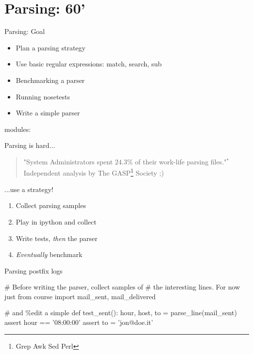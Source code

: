 \section{Parsing: 60'}

\begin{pyframe}{Parsing: Goal}
\begin{itemize}
\item Plan a parsing strategy
\item Use basic regular expressions: match, search, sub
\item Benchmarking a parser
\item Running nosetests
\item Write a simple parser
\end{itemize}
modules: 
\end{pyframe}


\begin{pyframe}{Parsing is hard...}
\begin{verse}
"System Administrators spent $24.3\%$ of
 their work-life parsing files."$^{*}$\\
\hfill *Independent analysis by The GASP\footnote{Grep Awk Sed Perl} Society ;)
\end{verse}
\end{pyframe}


\begin{pyframe}{...use a strategy!}
\begin{enumerate}
\Large
\item Collect parsing samples
\item Play in ipython and collect 
\item Write tests, \emph{then} the parser
\item \emph{Eventually} benchmark
\end{enumerate}
\end{pyframe}



\begin{pyframe}{Parsing postfix logs}
\begin{pycode}
# Before writing the parser, collect samples of
#  the interesting lines. For now just 
from course import mail_sent, mail_delivered

# and \%edit a simple 
def test_sent():
    hour, host, to = parse_line(mail_sent)
    assert hour == '08:00:00'
    assert to = 'jon@doe.it'

\end{pycode}
\end{pyframe}


